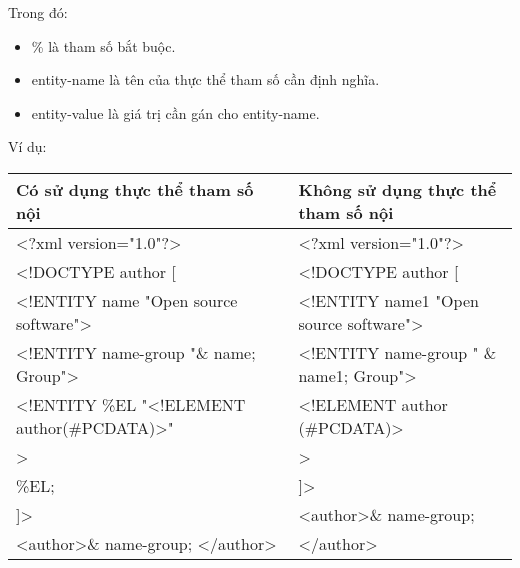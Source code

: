  Trong đó:
\begin{itemize}
 
 \item {\ttfamily  \% }là tham số bắt buộc.
  
 \item   {\ttfamily  entity-name} là tên của thực thể tham số cần định nghĩa.
   
 \item   {\ttfamily entity-value} là giá trị cần gán cho entity-name.

\end{itemize}   
 Ví dụ:

  \begin{center}
   
  \begin{longtable}{|m{5.5cm}|m{5.5cm}|}
 \hline

 \textbf{ Có sử dụng thực thể tham số nội} &
 
\textbf{ Không sử dụng thực thể tham số nội}\\ \hline
{\ttfamily 
 <?xml version="1.0"?>}&  	{\ttfamily  <?xml version="1.0"?>}\\ \hline
{\ttfamily   <!DOCTYPE author [ }&    {\ttfamily 	<!DOCTYPE author [} \\ \hline
{\ttfamily  <!ENTITY name "Open source software">} & {\ttfamily 	<!ENTITY name1 "Open source software">}\\ \hline
 
{\ttfamily  <!ENTITY name-group  "\& name; Group">} & 	{\ttfamily <!ENTITY name-group " \& name1; Group">}\\ \hline
{\ttfamily   <!ENTITY \%EL "<!ELEMENT author(\#PCDATA)>"} & 	 {\ttfamily <!ELEMENT author (\#PCDATA)>} \\ \hline
  {\ttfamily > }&  > \\\hline 
 
 {\ttfamily  \%EL;} &
 
{\ttfamily  ]> }  	\\ \hline
 
 {\ttfamily ]> } &   {\ttfamily <author>\& name-group;} \\ \hline
 {\ttfamily <author>\& name-group; </author>  } &	 {\ttfamily </author> }\\ \hline
  
 \end{longtable} 	
 
 \end{center}

  \vspace{-1cm}
